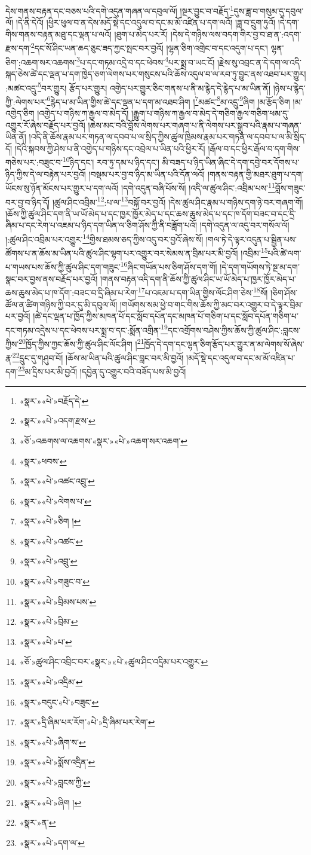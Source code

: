 དེས་གནས་བརྟན་དང་བཅས་པའི་དགེ་འདུན་གཞན་ལ་དབུལ་ལོ། །སྔར་བྱུང་བ་བརྗོད་\footnote{«སྣར་»«པེ་»བརྗོད་དེ་}དུས་ཟླ་བ་གསུམ་དུ་དབུལ་ལོ། །དེ་ནི་དེའོ། །ཕྱིར་ཕུལ་བ་ན་དེས་མདོ་སྡེ་དང་འདུལ་བ་དང་མ་མོ་འཛིན་པ་དག་ལའོ། །ཟླ་བ་དྲུག་ཏུའོ། །དེ་དག་གིས་གནས་བརྟན་མཐུ་དང་ལྡན་པ་ལའོ། །ཐུག་པ་མེད་པར་རོ། །དེས་དེ་གཉིས་ལས་བདག་གིར་བྱ་བ་ཐ་ན་:འདག་རྫས་དག་\footnote{«སྣར་»«པེ་»འདག་རྫས་}དང་སོ་ཤིང་ཡན་ཆད་ཅུང་ཟད་ཀྱང་སྤང་བར་བྱའོ། །ལྷན་ཅིག་འགྲེང་བ་དང་འདུག་པ་དང་། ལྷན་ཅིག་:འཆག་སར་འཆགས་\footnote{«ཅོ་»འཆགས་ལ་འཆགས་«སྣར་»«པེ་»འཆག་སར་འཆག་}པ་དང་གཏམ་འདྲེ་བ་དང་ཕེབས་\footnote{«སྣར་»ཕབས་}པར་སྨྲ་བ་ཡང་ངོ། །རྗེས་སུ་འབྲང་ན་དེ་དག་ལ་འདི་སྐད་ཅེས་ཚེ་དང་ལྡན་པ་དག་ཁྱེད་ཅག་ལེགས་པར་གསུངས་པའི་ཆོས་འདུལ་བ་ལ་རབ་ཏུ་བྱུང་ནས་འཐབ་པར་གྱུར། :མཚང་འདྲུ་\footnote{«སྣར་»«པེ་»འཚང་འབྲུ་}བར་གྱུར། རྩོད་པར་གྱུར། འགྱེད་པར་གྱུར་ཅིང་གནས་པ་ནི་མ་རྙེད་དེ་རྙེད་པ་མ་ཡིན་ནོ། །ཉེས་པ་རྙེད་ཀྱི་:ལེགས་པར་\footnote{«སྣར་»«པེ་»ལེགས་པ་}རྙེད་པ་མ་ཡིན་གྱིས་ཚེ་དང་ལྡན་པ་དག་མ་འཐབ་ཤིག །\footnote{«སྣར་»«པེ་»ཅིག །}མཚང་\footnote{«སྣར་»«པེ་»འཚང་}མ་འདྲུ་\footnote{«སྣར་»«པེ་»འབྲུ་}ཞིག །མ་རྩོད་ཅིག །མ་འགྱེད་ཅིག །འགྱེད་པ་གཉིས་ཀ་རྒྱལ་བ་མེད་དོ། །རྒྱུག་པ་གཉིས་ཀ་རྒྱལ་བ་མེད་དེ་གཅིག་རྒྱལ་གཅིག་ཕམ་དུ་འགྱུར་རོ་ཞེས་བརྗོད་པར་བྱའོ། །ཆེས་མང་བའི་བློས་ལེགས་པར་གཞག་པ་ནི་ལེགས་པར་སྒྲུབ་པའི་རྣམ་པ་གཞན་ཡིན་ནོ། །འདི་ནི་ཆོས་རྣམ་པར་གཏན་ལ་དབབ་པ་ལ་སྲིད་ཀྱིས་ཚུལ་ཁྲིམས་རྣམ་པར་གཏན་ལ་དབབ་པ་ལ་མི་སྲིད་དོ། །དེའི་སྐབས་ཀྱི་ཤེས་པ་ནི་འགྱེད་པ་གཉིས་དང་འབྲེལ་པ་ཡིན་པའི་ཕྱིར་རོ། །རྒོལ་བ་དང་ཕྱིར་རྒོལ་བ་དག་གིས་གཅེས་པར་:བཟུང་བ་\footnote{«སྣར་»«པེ་»གཟུང་བ་}ཉིད་དང་། རབ་ཏུ་དམ་པ་ཉིད་དང་། མི་བཟད་པ་ཉིད་ཡིན་ཞིང་དེ་དག་དབྱེ་བར་དོགས་པ་ཉིད་ཀྱིས་དེ་ལ་བརྟེན་པར་བྱའོ། །བསྡམ་པར་བྱ་བ་ཉིད་མ་ཡིན་པའི་དོན་ལའོ། །གནས་བརྟན་གྱི་མཐར་ཐུག་པ་དག་ཡོངས་སུ་ཉོན་མོངས་པར་གྱུར་པ་དག་ལའོ། །དགེ་འདུན་བཞི་པོས་སོ། །འདི་ལ་ཚུལ་ཤིང་:འབྲིམ་པས་\footnote{«སྣར་»«པེ་»བྲིམས་པས་}བློས་གཟུང་བར་བྱ་བ་ཉིད་དོ། །ཚུལ་ཤིང་འབྲིམ་\footnote{«སྣར་»«པེ་»བྲིམ་}:པ་ལ་\footnote{«སྣར་»«པེ་»པ་}བསྐོ་བར་བྱའོ། །དེས་ཚུལ་ཤིང་རྣམ་པ་གཉིས་དག་ཉེ་བར་གཞག་གོ། །ཆོས་ཀྱི་ཚུལ་ཤིང་དག་ནི་ཡ་ཡོ་མེད་པ་དང་ཁྱར་ཁྱོར་མེད་པ་དང་ཆས་ཆུས་མེད་པ་དང་ཁ་དོག་བཟང་བ་དང་དྲི་ཞིམ་པ་དང་རེག་པ་འཇམ་པ་ཉིད་དག་ཡིན་ལ་ཅིག་ཤོས་ཀྱི་ནི་བཟློག་པའོ། །དགེ་འདུན་ལ་འདུ་བར་གསོལ་ལོ། །:ཚུལ་ཤིང་འབྲིམ་པར་འགྱུར་\footnote{«ཅོ་»ཚུལ་ཤིང་འབྲིང་བར་«སྣར་»«པེ་»ཚུལ་ཤིང་འདྲིམ་པར་འགྱུར་}གྱིས་ཐམས་ཅད་ཀྱིས་འདུ་བར་བྱའོ་ཞེས་སོ། །གལ་ཏེ་དེ་ལྟར་འདུན་པ་སྦྱིན་པས་ཚོགས་པ་ན་ཆོས་མ་ཡིན་པའི་ཚུལ་ཤིང་ལྷག་པར་འགྱུར་བར་སེམས་ན་བྲིམ་པར་མི་བྱའོ། །འབྲིམ་\footnote{«སྣར་»«པེ་»འདྲིམ་}པའི་ཚེ་ལག་པ་གཡས་པས་ཆོས་ཀྱི་ཚུལ་ཤིང་དག་གཟུང་\footnote{«སྣར་»བདུང་«པེ་»བཟུང་}ཞིང་གཡོན་པས་ཅིག་ཤོས་དག་གོ། །དེ་དག་གཡོགས་ཏེ་སྔ་མ་དག་སྣང་བར་བྱས་ནས་བརྗོད་པར་བྱའོ། །གནས་བརྟན་འདི་དག་ནི་ཆོས་ཀྱི་ཚུལ་ཤིང་ཡ་ཡོ་མེད་པ་ཁྱར་ཁྱོར་མེད་པ་ཆས་ཆུས་མེད་པ་ཁ་དོག་:བཟང་བ་དྲི་ཞིམ་པ་རེག་\footnote{«སྣར་»དྲི་ཞིམ་པར་རོག་«པེ་»དྲི་ཞིམ་པར་རེག་}པ་འཇམ་པ་དག་ཡིན་གྱིས་ལོང་ཤིག་ཅེས་\footnote{«སྣར་»«པེ་»ཞིག་ས་}སོ། །ཅིག་ཤོས་ཚོལ་ན་ཚིག་གཉིས་ཀྱི་བར་དུ་མི་དབུལ་ལོ། །གཡོགས་སམ་ཕྱེ་བ་གང་གིས་ཆོས་ཀྱི་མང་བར་འགྱུར་བ་དེ་ལྟར་བྲིམ་པར་བྱའོ། །ཚེ་དང་ལྡན་པ་ཁྱོད་ཀྱིས་མཁན་པོ་དང་སློབ་དཔོན་དང་མཁན་པོ་གཅིག་པ་དང་སློབ་དཔོན་གཅིག་པ་དང་གཏམ་འདྲེས་པ་དང་ཕེབས་པར་སྨྲ་བ་དང་:སྨོན་འགྲིན་\footnote{«སྣར་»«པེ་»སྨོས་འདྲིན་}དང་འགྲོགས་བཤེས་ཀྱིས་ཆོས་ཀྱི་ཚུལ་ཤིང་:བླངས་ཀྱིས་\footnote{«སྣར་»«པེ་»བླངས་ཀྱི་}ཁྱོད་ཀྱིས་ཀྱང་ཆོས་ཀྱི་ཚུལ་ཤིང་ལོང་ཤིག །\footnote{«སྣར་»«པེ་»ཞིག །}ཁྱོད་དེ་དག་དང་ལྷན་ཅིག་རྩོད་པར་གྱུར་ན་མ་ལེགས་སོ་ཞེས་རྣ་\footnote{«སྣར་»ན་}དྲུང་དུ་གཤུབ་བོ། །ཆོས་མ་ཡིན་པའི་ཚུལ་ཤིང་བླང་བར་མི་བྱའོ། །མདོ་སྡེ་དང་འདུལ་བ་དང་མ་མོ་འཛིན་པ་དག་\footnote{«སྣར་»«པེ་»དག་ལ་}མ་དྲིས་པར་མི་བྱའོ། །དབྱེན་དུ་འགྱུར་བའི་བཟོད་པས་མི་བྱའོ། 